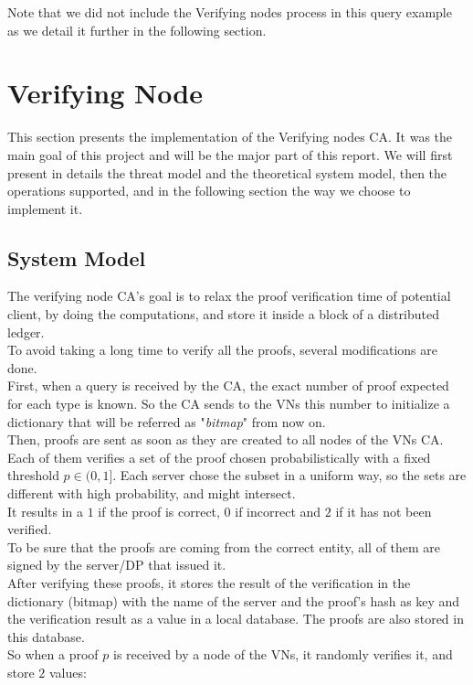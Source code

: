 \documentclass{article}
\begin{document}
Note that we did not include the Verifying nodes process in this query example as we detail it further in the following section.

\section{Verifying  Node}
This section presents the implementation of the Verifying nodes CA. It was the main goal of this project and will be the major part of this report. We will first present in details the threat model and the theoretical system model, then the operations supported, and in the following section the way we choose to implement it.\\
\subsection{System Model}
The verifying node CA's goal is to relax the proof verification time of potential client, by doing the computations, and store it inside a block of a distributed ledger.\\
To avoid taking a long time to verify all the proofs, several modifications are done.\\
First, when a query is received by the CA, the exact number of proof expected for each type is known. So the CA sends to the VNs this number to initialize a dictionary that will be referred as "\textit{bitmap}" from now on.\\
Then, proofs are sent as soon as they are created to all nodes of the VNs CA. Each of them verifies a set of the proof chosen probabilistically with a fixed threshold $p \in (0,1]$. Each server chose the subset in a uniform way, so the sets are different with high probability, and might intersect.\\
It results in a $1$ if the proof is correct, $0$ if incorrect and $2$ if it has not been verified.\\
To be sure that the proofs are coming from the correct entity, all of them are signed by the server/DP that issued it.\\
After verifying these proofs, it stores the result of the verification in the dictionary (bitmap) with the name of the server and the proof's hash as key and the verification result as a value in a local database. The proofs are also stored in this database.\\
So when a proof $p$ is received by a node of the VNs, it randomly verifies it, and store $2$ values:\\
\end{document}
